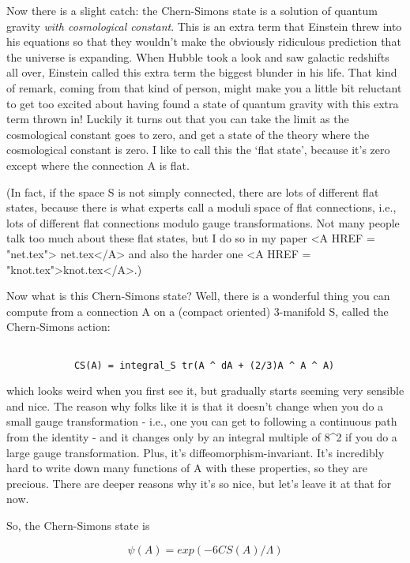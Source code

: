 Now there is a slight catch: the Chern-Simons state is a solution
of quantum gravity \emph{with cosmological constant}.  This is an
extra term that Einstein threw into his equations so that they
wouldn't make the obviously ridiculous prediction that the universe
is expanding.  When Hubble took a look and saw galactic redshifts
all over, Einstein called this extra term the biggest blunder in his
life.  That kind of remark, coming from that kind of person, might
make you a little bit reluctant to get too excited about having found a 
state of quantum gravity with this extra term thrown in!  Luckily
it turns out that you can take the limit as the cosmological constant
goes to zero, and get a state of the theory where the cosmological
constant is zero.  I like to call this the `flat state', because it's zero
except where the connection A is flat.  

(In fact, if the space S is not simply connected, there are lots of 
different flat states, because there is what experts call a moduli 
space of flat connections, i.e., lots of different flat connections 
modulo gauge transformations.  Not many people talk too much 
about these flat states, but I do so in my paper <A HREF = "net.tex">
net.tex</A> and also 
the harder one <A HREF = "knot.tex">knot.tex</A>.)

Now what is this Chern-Simons state?  Well, there is a wonderful
thing you can compute from a connection A on a (compact oriented)
3-manifold S, called the Chern-Simons action:


\begin{verbatim}

            CS(A) = integral_S tr(A ^ dA + (2/3)A ^ A ^ A)
\end{verbatim}
    

which looks weird when you first see it, but gradually starts seeming
very sensible and nice.  The reason why folks like it is that it doesn't
change when you do a small gauge transformation - i.e., one you
can get to following a continuous path from the identity - and it
changes only by an integral multiple of 8\pi ^2 if you do a large
gauge transformation.  Plus, it's diffeomorphism-invariant.  It's
incredibly hard to write down many functions of A with these properties,
so they are precious.  There are deeper reasons why it's so nice, but
let's leave it at that for now.

So, the Chern-Simons state is


$$

                \psi (A) = exp(-6 CS(A)/\Lambda )
$$
    

